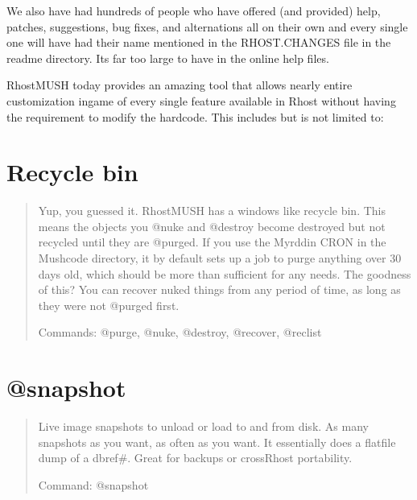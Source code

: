 \documentclass[letterpaper,10pt,english]{sphinxmanual}
\begin{document}
\sphinxAtStartPar
We also have had hundreds of people who have offered (and provided) help,
patches, suggestions, bug fixes, and alternations all on their own and
every single one will have had their name mentioned in the RHOST.CHANGES
file in the readme directory.  It\textquotesingle{}s far too large to have in the online
help files.

\sphinxAtStartPar
RhostMUSH today provides an amazing tool that allows nearly entire
customization in\sphinxhyphen{}game of every single feature available in Rhost without
having the requirement to modify the hardcode.  This includes but is
not limited to:


\section{Recycle bin}
\label{\detokenize{features:recycle-bin}}\begin{quote}

\sphinxAtStartPar
Yup, you guessed it.  RhostMUSH has a windows like recycle bin.
This means the objects you @nuke and @destroy become \textquotesingle{}destroyed\textquotesingle{}
but not recycled until they are @purged.  If you use the Myrddin
CRON in the Mushcode directory, it by default sets up a job
to purge anything over 30 days old, which should be more than
sufficient for any needs.  The goodness of this?  You can recover
nuked things from any period of time, as long as they were not
@purged first.

\sphinxAtStartPar
Commands: @purge, @nuke, @destroy, @recover, @reclist
\end{quote}


\section{@snapshot}
\label{\detokenize{features:snapshot}}\begin{quote}

\sphinxAtStartPar
Live image snapshots to unload or load to and from
disk.  As many snapshots as you want, as often as you want.
It essentially does a flatfile dump of a dbref\#.  Great for
backups or cross\sphinxhyphen{}Rhost portability.

\sphinxAtStartPar
Command: @snapshot
\end{quote}
\end{document}
